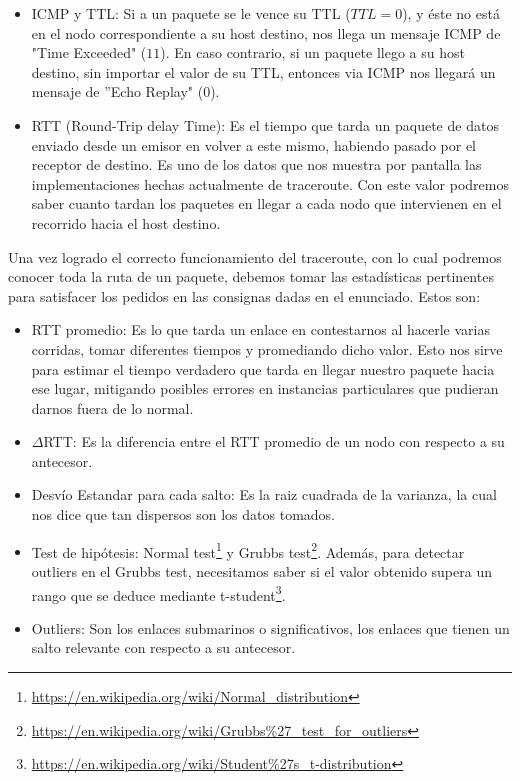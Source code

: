 \begin{itemize}
\item ICMP y TTL: Si a un paquete se le vence su TTL ($TTL = 0$), y \'este no est\'a en el nodo correspondiente a su host destino, nos llega un mensaje ICMP de "Time Exceeded" ($11$). En caso contrario, si un paquete llego a su host destino, sin importar el valor de su TTL, entonces via ICMP nos llegar\'a un mensaje de ''Echo Replay" ($0$).

\item RTT (Round-Trip delay Time): Es el tiempo que tarda un paquete de datos enviado desde un emisor en volver a este mismo, habiendo pasado por el receptor de destino. Es uno de los datos que nos muestra por pantalla las implementaciones hechas actualmente de traceroute. Con este valor podremos saber cuanto tardan los paquetes en llegar a cada nodo que intervienen en el recorrido hacia el host destino.

\end{itemize}

Una vez logrado el correcto funcionamiento del traceroute, con lo cual podremos conocer toda la ruta de un paquete, debemos tomar las estadísticas pertinentes para satisfacer los pedidos en las consignas dadas en el enunciado. Estos son:

\begin{itemize}

\item RTT promedio: Es lo que tarda un enlace en contestarnos al hacerle varias corridas, tomar diferentes tiempos y promediando dicho valor. Esto nos sirve para estimar el tiempo verdadero que tarda en llegar nuestro paquete hacia ese lugar, mitigando posibles errores en instancias particulares que pudieran darnos fuera de lo normal.

\item $\Delta$RTT: Es la diferencia entre el RTT promedio de un nodo con respecto a su antecesor.

\item Desv\'io Estandar para cada salto: Es la raiz cuadrada de la varianza, la cual nos dice que tan dispersos son los datos tomados.

\item Test de hip\'otesis: Normal test\footnote{\url{https://en.wikipedia.org/wiki/Normal_distribution}} y Grubbs test\footnote{\url{https://en.wikipedia.org/wiki/Grubbs\%27_test_for_outliers}}. Adem\'as, para detectar outliers en el Grubbs test, necesitamos saber si el valor obtenido supera un rango que se deduce mediante t-student\footnote{\url{https://en.wikipedia.org/wiki/Student\%27s_t-distribution}}.

\item Outliers: Son los enlaces submarinos o significativos, los enlaces que tienen un salto relevante con respecto a su antecesor.

\end{itemize}


